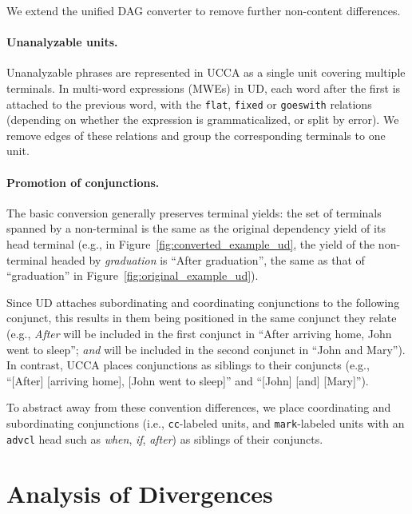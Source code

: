 \documentclass[11pt,a4paper]{article}
\begin{document}
We extend the unified DAG converter to remove further non-content differences.

\paragraph{Unanalyzable units.}
Unanalyzable phrases are represented in UCCA as a single unit covering multiple terminals.
In multi-word expressions (MWEs) in UD, each word after the first is attached to the previous word,
with the \texttt{flat}, \texttt{fixed} or \texttt{goeswith} relations
(depending on whether the expression is grammaticalized, or split by error).
We remove edges of these relations and group the corresponding terminals to one unit.

\paragraph{Promotion of conjunctions.}
The basic conversion generally preserves terminal yields:
the set of terminals spanned by a non-terminal is the same
as the original dependency yield of its head terminal
(e.g., in Figure~\ref{fig:converted_example_ud}, the yield of the non-terminal
headed by \textit{graduation} is ``After graduation'', the same as that of ``graduation''
in Figure~\ref{fig:original_example_ud}).

Since UD attaches subordinating and coordinating conjunctions to the following conjunct,
this results in them being positioned in the same conjunct they relate (e.g.,
\textit{After} will be included in the first conjunct in ``After arriving home, John went to sleep'';
\textit{and} will be included in the second conjunct in ``John and Mary'').
In contrast, UCCA places conjunctions as siblings to their conjuncts (e.g.,
``[After] [arriving home], [John went to sleep]'' and ``[John] [and] [Mary]''). 

To abstract away from these convention differences,
we place 
coordinating and subordinating conjunctions 
(i.e., \texttt{cc}-labeled units, and \texttt{mark}-labeled units with an \texttt{advcl} head such 
as \textit{when}, \textit{if}, \textit{after}) as siblings of their conjuncts.


\section{Analysis of Divergences}\label{sec:analysis}
\end{document}
